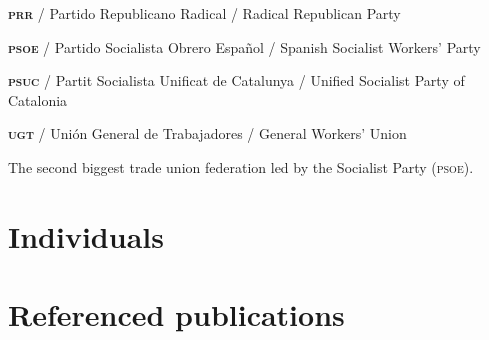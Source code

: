 \begin{multicols}{2}
  \bigskip

  \textbf{\textsc{prr}} / Partido Republicano Radical / Radical Republican Party

  \bigskip

  \textbf{\textsc{psoe}} / Partido Socialista Obrero Español / Spanish Socialist Workers' Party

  \bigskip

  \textbf{\textsc{psuc}} / Partit Socialista Unificat de Catalunya / Unified Socialist Party of Catalonia

  \bigskip

  \textbf{\textsc{ugt}} / Unión General de Trabajadores / General Workers’ Union

  The second biggest trade union federation led by the Socialist Party (\textsc{psoe}).

\end{multicols}

\section{Individuals}

\section{Referenced publications}

